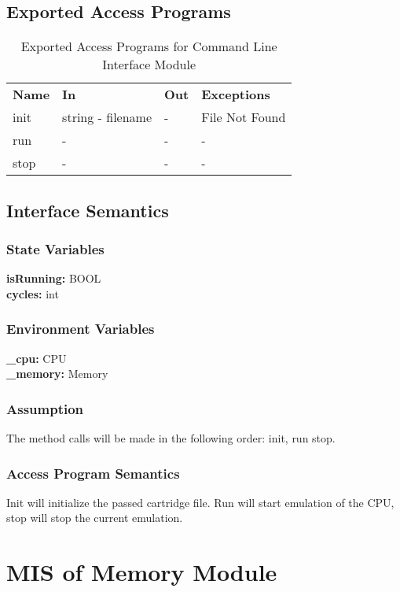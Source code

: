 \documentclass[12pt]{article}
\begin{document}
	\subsection{Exported Access Programs}
		\begin{table}[H]
			\centering
			\begin{tabular}{p{1.5in} p{1.5in} p{1.5in} p{1.5in}}
				\hline
				\textbf{Name} & \textbf{In} & \textbf{Out} & \textbf{Exceptions}\\
				init & string - filename & - & File Not Found\\
				run & - & - & -\\
				stop & - & - & -\\
			\end{tabular}
			\caption{Exported Access Programs for Command Line Interface Module}
		\end{table}
	\subsection{Interface Semantics}
		\subsubsection{State Variables}
			\textbf{isRunning: } BOOL\\

			\textbf{cycles: } int\\
		\subsubsection{Environment Variables}
			\textbf{\_cpu: } CPU\\

			\textbf{\_memory: } Memory\\
		\subsubsection{Assumption}
			The method calls will be made in the following order: init, run stop.
		\subsubsection{Access Program Semantics}
			Init will initialize the passed cartridge file. Run will start emulation of the CPU, stop will stop the current emulation.


\section{MIS of Memory Module}
\end{document}
